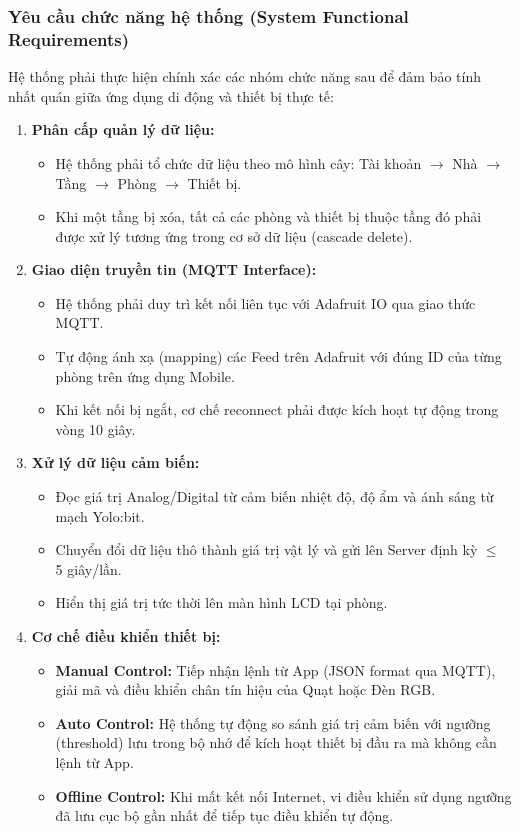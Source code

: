 \subsubsection{Yêu cầu chức năng hệ thống (System Functional Requirements)}

Hệ thống phải thực hiện chính xác các nhóm chức năng sau để đảm bảo tính nhất quán giữa ứng dụng di động và thiết bị thực tế:

\begin{enumerate}[label=\textbf{SR\arabic*:}]
    \item \textbf{Phân cấp quản lý dữ liệu:}
    \begin{itemize}
        \item Hệ thống phải tổ chức dữ liệu theo mô hình cây: Tài khoản $\rightarrow$ Nhà $\rightarrow$ Tầng $\rightarrow$ Phòng $\rightarrow$ Thiết bị.
        \item Khi một tầng bị xóa, tất cả các phòng và thiết bị thuộc tầng đó phải được xử lý tương ứng trong cơ sở dữ liệu (cascade delete).
    \end{itemize}

    \item \textbf{Giao diện truyền tin (MQTT Interface):}
    \begin{itemize}
        \item Hệ thống phải duy trì kết nối liên tục với Adafruit IO qua giao thức MQTT.
        \item Tự động ánh xạ (mapping) các Feed trên Adafruit với đúng ID của từng phòng trên ứng dụng Mobile.
        \item Khi kết nối bị ngắt, cơ chế reconnect phải được kích hoạt tự động trong vòng 10 giây.
    \end{itemize}

    \item \textbf{Xử lý dữ liệu cảm biến:}
    \begin{itemize}
        \item Đọc giá trị Analog/Digital từ cảm biến nhiệt độ, độ ẩm và ánh sáng từ mạch Yolo:bit.
        \item Chuyển đổi dữ liệu thô thành giá trị vật lý và gửi lên Server định kỳ $\leq$ 5 giây/lần.
        \item Hiển thị giá trị tức thời lên màn hình LCD tại phòng.
    \end{itemize}

    \item \textbf{Cơ chế điều khiển thiết bị:}
    \begin{itemize}
        \item \textbf{Manual Control:} Tiếp nhận lệnh từ App (JSON format qua MQTT), giải mã và điều khiển chân tín hiệu của Quạt hoặc Đèn RGB.
        \item \textbf{Auto Control:} Hệ thống tự động so sánh giá trị cảm biến với ngưỡng (threshold) lưu trong bộ nhớ để kích hoạt thiết bị đầu ra mà không cần lệnh từ App.
        \item \textbf{Offline Control:} Khi mất kết nối Internet, vi điều khiển sử dụng ngưỡng đã lưu cục bộ gần nhất để tiếp tục điều khiển tự động.
    \end{itemize}


\end{enumerate}
